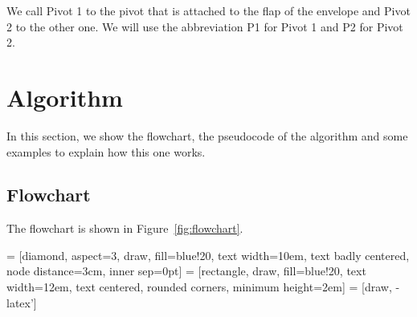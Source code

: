 We call Pivot 1 to the pivot that is attached to the flap of the envelope and Pivot 2 to the other one. We will use the abbreviation P1 for Pivot 1 and P2 for Pivot 2.

\section{Algorithm}
In this section, we show the flowchart, the pseudocode of the algorithm and some examples to explain how this one works.

\subsection{Flowchart}
The flowchart is shown in Figure~\ref{fig:flowchart}.

 = [diamond, aspect=3, draw, fill=blue!20, 
text width=10em, text badly centered, node distance=3cm, inner sep=0pt]
 = [rectangle, draw, fill=blue!20, 
text width=12em, text centered, rounded corners, minimum height=2em]
 = [draw, -latex']
